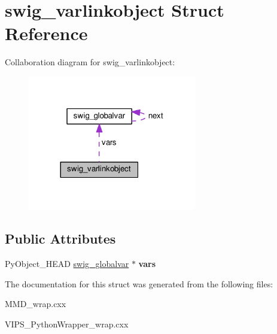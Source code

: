 \hypertarget{structswig__varlinkobject}{}\section{swig\+\_\+varlinkobject Struct Reference}
\label{structswig__varlinkobject}


Collaboration diagram for swig\+\_\+varlinkobject\+:
\nopagebreak
\begin{figure}[H]
\begin{center}
\leavevmode
\includegraphics[width=209pt]{structswig__varlinkobject__coll__graph}
\end{center}
\end{figure}
\subsection*{Public Attributes}
\begin{DoxyCompactItemize}
\item 
Py\+Object\+\_\+\+H\+E\+AD \hyperlink{structswig__globalvar}{swig\+\_\+globalvar} $\ast$ {\bfseries vars}\hypertarget{structswig__varlinkobject_a7c03e9f19969e73923a456aefd82ff05}{}\label{structswig__varlinkobject_a7c03e9f19969e73923a456aefd82ff05}

\end{DoxyCompactItemize}


The documentation for this struct was generated from the following files\+:\begin{DoxyCompactItemize}
\item 
M\+M\+D\+\_\+wrap.\+cxx\item 
V\+I\+P\+S\+\_\+\+Python\+Wrapper\+\_\+wrap.\+cxx\end{DoxyCompactItemize}
